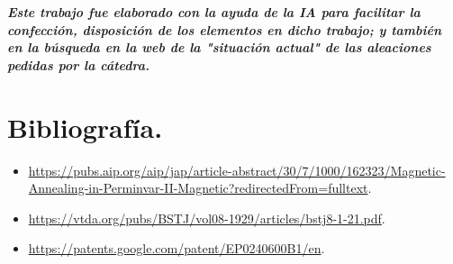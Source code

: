 \documentclass[12pt,a4paper]{article}
\begin{document}
\vfill
\textit{\textbf{Este trabajo fue elaborado con la ayuda de la IA para facilitar la confección, disposición de los elementos en dicho trabajo; y también en la búsqueda en la web de la "situación actual" de las aleaciones pedidas por la cátedra.}}
\newpage

\section{Bibliografía.}

\begin{itemize}
    \item \url{https://pubs.aip.org/aip/jap/article-abstract/30/7/1000/162323/Magnetic-Annealing-in-Perminvar-II-Magnetic?redirectedFrom=fulltext}.
    \item \url{https://vtda.org/pubs/BSTJ/vol08-1929/articles/bstj8-1-21.pdf}.
    \item \url{https://patents.google.com/patent/EP0240600B1/en}.
\end{itemize}
\end{document}

